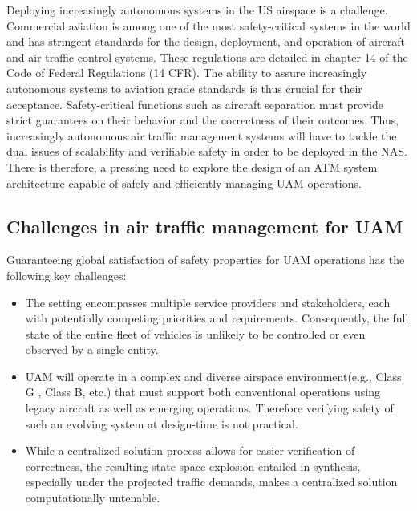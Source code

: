 Deploying increasingly autonomous systems in the US airspace is a challenge. Commercial aviation is among one of the most safety-critical systems in the world and has stringent standards for the design, deployment, and operation of aircraft and air traffic control systems. These regulations are detailed in chapter 14 of the Code of Federal Regulations (14 CFR). The ability to assure increasingly autonomous systems to aviation grade standards is thus crucial for their acceptance.  Safety-critical functions such as aircraft separation must provide strict guarantees on their behavior and the correctness of their outcomes.  Thus, increasingly autonomous air traffic management systems will have to tackle the dual issues of scalability and verifiable safety in order to be deployed in the NAS. There is therefore, a pressing need to explore the design of an ATM system architecture capable of safely and efficiently managing UAM operations. 

\subsection{Challenges in air traffic management for UAM}

Guaranteeing global satisfaction of safety properties for UAM operations has the following key challenges:

\begin{itemize}
    \item The setting encompasses multiple service providers and stakeholders, each with potentially competing priorities and requirements. Consequently, the full state of the entire fleet of vehicles is unlikely to be controlled or even observed by a single entity. 
    \item UAM will operate in a complex and diverse airspace environment(e.g., Class G \cite{FAA2014}, Class B, etc.) that must support both conventional operations using legacy aircraft as well as emerging operations. Therefore verifying safety of such an evolving system at design-time is not practical.
    \item While a centralized solution process allows for easier verification of correctness, the resulting state space explosion entailed in synthesis, especially under the projected traffic demands, makes a centralized solution computationally untenable. 
\end{itemize}


